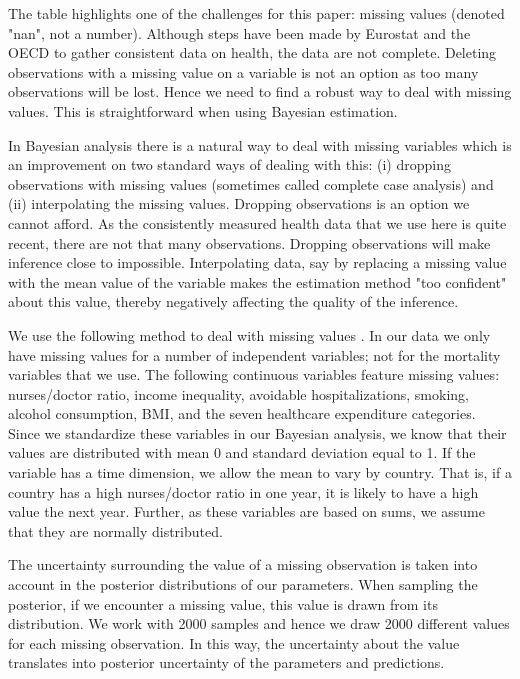 \documentclass{article}
\begin{document}
The table highlights one of the challenges for this paper: missing values (denoted "nan", not a number). Although steps have been made by Eurostat and the OECD to gather consistent data on health, the data are not complete. Deleting observations with a missing value on a variable is not an option as too many observations will be lost. Hence we need to find a robust way to deal with missing values. This is straightforward when using Bayesian estimation.

In Bayesian analysis there is a natural way to deal with missing variables which is an improvement on two standard ways of dealing with this: (i) dropping observations with missing values (sometimes called complete case analysis) and (ii) interpolating the missing values. Dropping observations is an option we cannot afford. As the consistently measured health data that we use here is quite recent, there are not that many observations. Dropping observations will make inference close to impossible. Interpolating data, say by replacing a missing value with the mean value of the variable makes the estimation method "too confident" about this value, thereby negatively affecting the quality of the inference.

We use the following method to deal with missing values \citep{mcelreath}. In our data we only have missing values for a number of independent variables; not for the mortality variables that we use. The following continuous variables feature missing values: nurses/doctor ratio, income inequality, avoidable hospitalizations, smoking, alcohol consumption, BMI, and the seven healthcare expenditure categories. Since we standardize these variables in our Bayesian analysis, we know that their values are distributed with mean 0 and standard deviation equal to 1. If the variable has a time dimension, we allow the mean to vary by country. That is, if a country has a high nurses/doctor ratio in one year, it is likely to have a high value the next year. Further, as these variables are based on sums, we assume that they are normally distributed.

The uncertainty surrounding the value of a missing observation is taken into account in the posterior distributions of our parameters. When sampling the posterior, if we encounter a missing value, this value is drawn from its distribution. We work with 2000 samples and hence we draw 2000 different values for each missing observation. In this way, the uncertainty about the value translates into posterior uncertainty of the parameters and predictions.
\end{document}
